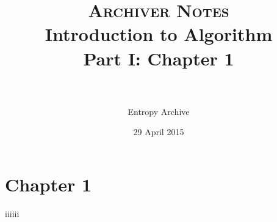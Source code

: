 \documentclass{article}
\title{
    \normalfont \normalsize
    \textsc{Archiver Notes} 
    \horrule{0.5pt} \\
    \huge Introduction to Algorithm \\
    \small Part I: Chapter 1\\
    \horrule{2pt} \\
}
\author{Entropy Archive}
\date{\normalsize 29 April 2015}
\begin{document}
\maketitle
\section*{Chapter 1}
iiiiii    
\end{document}
